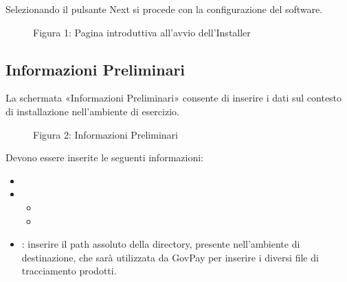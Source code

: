 \documentclass[letterpaper,10pt,italian]{sphinxmanual}
\begin{document}
Selezionando il pulsante Next si procede con la configurazione del
software.

\begin{figure}[htbp]
\centering
\capstart

\noindent{}
\caption{Figura 1: Pagina introduttiva all’avvio dell’Installer}\label{\detokenize{configurazione/index:id1}}\end{figure}


\subsection{Informazioni Preliminari}
\label{\detokenize{configurazione/index:informazioni-preliminari}}
La schermata «Informazioni Preliminari» consente di inserire i dati sul
contesto di installazione nell’ambiente di esercizio.

\begin{figure}[htbp]
\centering
\capstart

\noindent{}
\caption{Figura 2: Informazioni Preliminari}\label{\detokenize{configurazione/index:id2}}\end{figure}

Devono essere inserite le seguenti informazioni:
\begin{itemize}
\item {} 

\item {} 
\begin{itemize}
\item {} 

\item {} 

\end{itemize}

\item {} 
: inserire il path assoluto della directory, presente
nell’ambiente di destinazione, che sarà utilizzata da GovPay per
inserire i diversi file di tracciamento prodotti.

\end{itemize}
\end{document}
